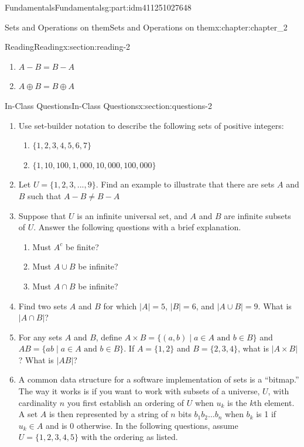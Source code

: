 \documentclass[oneside,10pt,]{book}
\numberwithin{equation}{section}
\begin{document}
\begin{partptx}{Fundamentals}{}{Fundamentals}{}{}{g:part:idm411251027648}
\begin{chapterptx}{Sets and Operations on them}{}{Sets and Operations on them}{}{}{x:chapter:chapter_2}
\begin{sectionptx}{Reading}{}{Reading}{}{}{x:section:reading-2}
\begin{itemize}[label=\textbullet]
\begin{multicols}{2}
\begin{enumerate}[label=(\alph*)]
\item{}\(A-B = B-A\)%
\item{}\(A \oplus  B = B \oplus  A\)%
\end{enumerate}
\end{multicols}
%
\end{itemize}
%
\end{sectionptx}
%
%
\typeout{************************************************}
\typeout{************************************************}
%
\begin{sectionptx}{In-Class Questions}{}{In-Class Questions}{}{}{x:section:questions-2}
%
\begin{enumerate}[label=\arabic*.]
\item{}Use set-builder notation to describe the following sets of positive integers:%
\begin{enumerate}[label=(\alph*)]
\item{}\(\{1, 2, 3, 4, 5, 6, 7\}\)%
\item{}\(\{1, 10, 100, 1,000, 10,000, 100,000\}\)%
\end{enumerate}
%
\item{}Let \(U= \{1, 2, 3, . . . , 9\}\).  Find an example to illustrate that there are sets \(A\) and \(B\) such that \(A - B \neq  B - A\)%
\item{}Suppose that \(U\) is an infinite universal set, and \(A\) and \(B\) are infinite subsets of \(U\). Answer the following questions with a brief explanation.%
\par
%
\begin{enumerate}[label=(\alph*)]
\item{}Must \(A^c\) be finite?%
\item{}Must \(A\cup B\) be infinite?%
\item{}Must \(A\cap B\) be infinite?%
\end{enumerate}
%
\item{}Find two sets \(A\) and \(B\) for which \(|A| = 5\), \(|B| = 6\), and \(|A\cup B| = 9\). What is \(|A \cap B|\)?%
\item{}For any sets \(A\) and \(B\), define \(A\times B = \{(a,b) \mid a\in A \text{ and } b \in B\}\) and \(AB = \{ab \mid a\in A \text{ and } b \in B\}\). If \(A = \{1,2\}\) and \(B = \{2,3,4\}\),  what is \(|A \times B|\)? What is \(|AB|\)?%
\item{}A common data structure for a software implementation of sets is a ``bitmap.''  The way it works is if you want to work with subsets of a universe, \(U\), with cardinality \(n\) you first establish an ordering of \(U\) when \(u_k\) is the \(k\)th element.  A set \(A\) is then represented by a string of \(n\) bits  \(b_1b_2\dots b_n\) when \(b_k\) is 1 if \(u_k \in A\) and is 0 otherwise. In the following questions, assume \(U=\{1,2,3,4,5\}\) with the ordering as listed.%

\end{enumerate}
\end{sectionptx}
\end{chapterptx}
\end{partptx}
\end{document}
